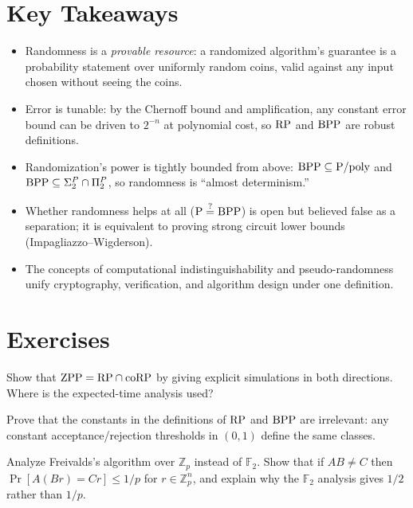 \section*{Key Takeaways}
\begin{itemize}
\item Randomness is a \emph{provable resource}: a randomized algorithm's guarantee is a probability statement over uniformly random coins, valid against any input chosen without seeing the coins.
\item Error is tunable: by the Chernoff bound and amplification, any constant error bound can be driven to $2^{-n}$ at polynomial cost, so $\text{RP}$ and $\text{BPP}$ are robust definitions.
\item Randomization's power is tightly bounded from above: $\text{BPP} \subseteq \text{P}/\text{poly}$ and $\text{BPP} \subseteq \Sigma_2^P \cap \Pi_2^P$, so randomness is ``almost determinism.''
\item Whether randomness helps at all ($\text{P} \stackrel{?}{=} \text{BPP}$) is open but believed false as a separation; it is equivalent to proving strong circuit lower bounds (Impagliazzo--Wigderson).
\item The concepts of computational indistinguishability and pseudo-randomness unify cryptography, verification, and algorithm design under one definition.
\end{itemize}

\section{Exercises}
\label{sec:randomized:exercises}

\begin{exercise}[Basic]
Show that $\text{ZPP} = \text{RP} \cap \text{coRP}$ by giving explicit simulations in both directions. Where is the expected-time analysis used?
\end{exercise}

\begin{exercise}[Basic]
Prove that the constants in the definitions of $\text{RP}$ and $\text{BPP}$ are irrelevant: any constant acceptance/rejection thresholds in $(0,1)$ define the same classes.
\end{exercise}

\begin{exercise}[Basic]
Analyze Freivalds's algorithm over $\mathbb{Z}_p$ instead of $\mathbb{F}_2$. Show that if $AB \neq C$ then $\Pr[A(Br) = Cr] \le 1/p$ for $r \in \mathbb{Z}_p^n$, and explain why the $\mathbb{F}_2$ analysis gives $1/2$ rather than $1/p$.
\end{exercise}

